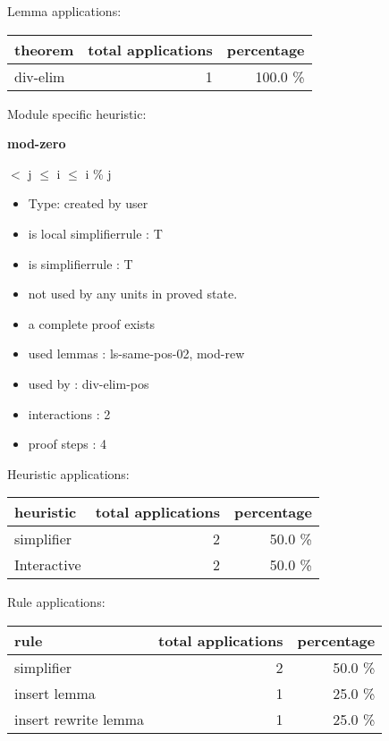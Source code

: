\documentclass[a4paper]{article}
\begin{document}
Lemma applications:

\begin{supertabular}{l|r|r}
theorem	        & total applications & percentage \\ \hline
div-elim & 1 & 100.0 \% \\

\end{supertabular}

Module specific heuristic:

\pagebreak

{\LARGE\bf mod-zero}\label{lemma-mod-zero}

\medskip

  $<$ j  $\le$ i  $\le$ i \% j

\begin{itemize}

\item Type: created by user

\item is local simplifierrule : T
\item is simplifierrule : T
\item not used by any units in proved state.
\item       a complete proof exists
\item       used lemmas  : ls-same-pos-02, mod-rew
\item       used by      : div-elim-pos
\item       interactions : 2
\item       proof steps  : 4
\end{itemize}

\medskip


Heuristic applications:

\begin{supertabular}{l|r|r}
heuristic	& total applications & percentage \\ \hline
simplifier & 2 & 50.0 \% \\
Interactive & 2 & 50.0 \% \\

\end{supertabular}

Rule applications:

\begin{supertabular}{l|r|r}
rule	        & total applications & percentage \\ \hline
simplifier & 2 & 50.0 \% \\
insert lemma & 1 & 25.0 \% \\
insert rewrite lemma & 1 & 25.0 \% \\

\end{supertabular}
\end{document}
